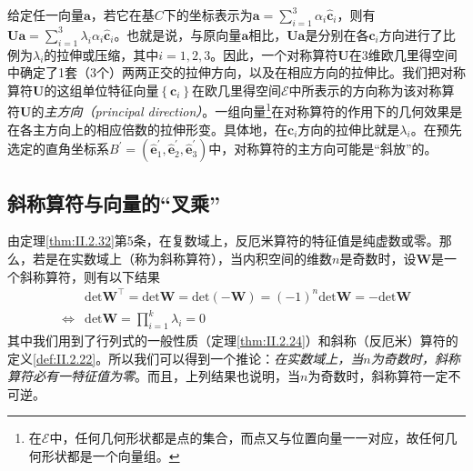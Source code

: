 \documentclass[../main.tex]{subfiles}
\begin{document}
给定任一向量$\mathbf{a}$，若它在基$C$下的坐标表示为$\mathbf{a}=\sum_{i=1}^3\alpha_i\mathbf{\hat{c}}_i$，则有$\mathbf{Ua}=\sum_{i=1}^3\lambda_i\alpha_i\mathbf{\hat{c}}_i$。也就是说，与原向量$\mathbf{a}$相比，$\mathbf{Ua}$是分别在各$\mathbf{\hat{c}}_i$方向进行了比例为$\lambda_i$的拉伸或压缩，其中$i=1,2,3$。因此，一个对称算符$\mathbf{U}$在3维欧几里得空间中确定了1套（3个）两两正交的拉伸方向，以及在相应方向的拉伸比。我们把对称算符$\mathbf{U}$的这组单位特征向量$\left\{\mathbf{c}_i\right\}$在欧几里得空间$\mathcal{E}$中所表示的方向称为该对称算符$\mathbf{U}$的\emph{主方向（principal direction）}。一组向量\footnote{在$\mathcal{E}$中，任何几何形状都是点的集合，而点又与位置向量一一对应，故任何几何形状都是一个向量组。}在对称算符的作用下的几何效果是在各主方向上的相应倍数的拉伸形变。具体地，在$\mathbf{c}_i$方向的拉伸比就是$\lambda_i$。在预先选定的直角坐标系$B^\prime=\left(\mathbf{\hat{e}}^\prime_1,\mathbf{\hat{e}}^\prime_2,\mathbf{\hat{e}}^\prime_3\right)$中，对称算符的主方向可能是“斜放”的。

\subsection{斜称算符与向量的“叉乘”}\label{sec:II.3.3.3}
由定理\ref{thm:II.2.32}第5条，在复数域上，反厄米算符的特征值是纯虚数或零。那么，若是在实数域上（称为斜称算符），当内积空间的维数$n$是奇数时，设$\mathbf{W}$是一个斜称算符，则有以下结果
\begin{align*}
                    & \mathrm{det}\mathbf{W}^\intercal=\mathrm{det}\mathbf{W}=\mathrm{det}\left(-\mathbf{W}\right)=\left(-1\right)^n\mathrm{det}\mathbf{W}=-\mathrm{det}\mathbf{W} \\
    \Leftrightarrow & \mathrm{det}\mathbf{W}=\prod_{i=1}^k\lambda_i=0
\end{align*}
其中我们用到了行列式的一般性质（定理\ref{thm:II.2.24}）和斜称（反厄米）算符的定义\ref{def:II.2.22}。所以我们可以得到一个推论：\emph{在实数域上，当$n$为奇数时，斜称算符必有一特征值为零}。而且，上列结果也说明，当$n$为奇数时，斜称算符一定不可逆。
\end{document}
